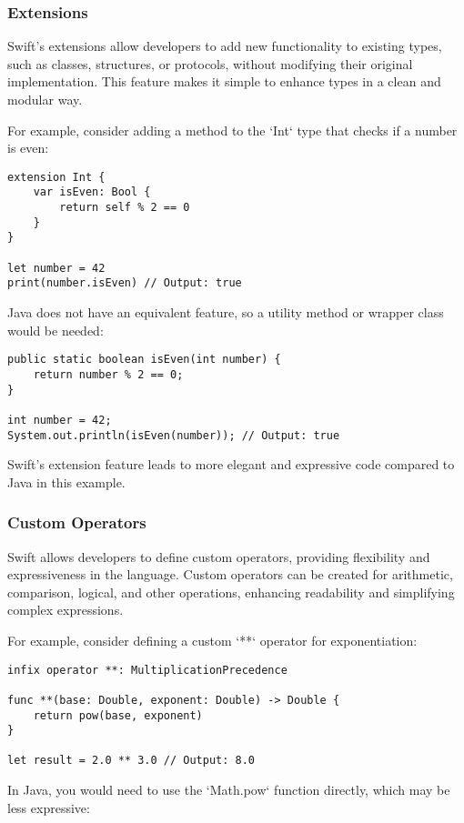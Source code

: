 \subsubsection{Extensions}
Swift's extensions allow developers to add new functionality to existing types, such as classes, structures, or protocols, without modifying their original implementation. This feature makes it simple to enhance types in a clean and modular way.

For example, consider adding a method to the `Int` type that checks if a number is even:

\begin{verbatim}
extension Int {
    var isEven: Bool {
        return self % 2 == 0
    }
}

let number = 42
print(number.isEven) // Output: true
\end{verbatim}

Java does not have an equivalent feature, so a utility method or wrapper class would be needed:

\begin{verbatim}
public static boolean isEven(int number) {
    return number % 2 == 0;
}

int number = 42;
System.out.println(isEven(number)); // Output: true
\end{verbatim}

Swift's extension feature leads to more elegant and expressive code compared to Java in this example.

\subsubsection{Custom Operators}
Swift allows developers to define custom operators, providing flexibility and expressiveness in the language. Custom operators can be created for arithmetic, comparison, logical, and other operations, enhancing readability and simplifying complex expressions.

For example, consider defining a custom `**` operator for exponentiation:

\begin{verbatim}
infix operator **: MultiplicationPrecedence

func **(base: Double, exponent: Double) -> Double {
    return pow(base, exponent)
}

let result = 2.0 ** 3.0 // Output: 8.0
\end{verbatim}

In Java, you would need to use the `Math.pow` function directly, which may be less expressive:

